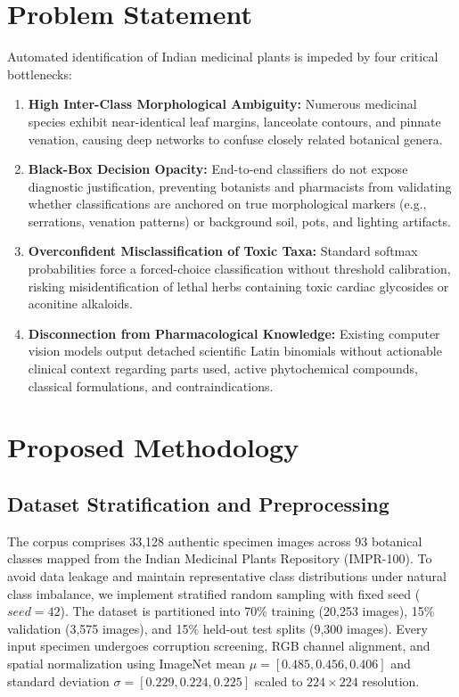 \documentclass[sn-mathphys,Numbered]{sn-jnl}%
\begin{document}
\section{Problem Statement}\label{sec3}
Automated identification of Indian medicinal plants is impeded by four critical bottlenecks:
\begin{enumerate}
    \item \textbf{High Inter-Class Morphological Ambiguity:} Numerous medicinal species exhibit near-identical leaf margins, lanceolate contours, and pinnate venation, causing deep networks to confuse closely related botanical genera.
    \item \textbf{Black-Box Decision Opacity:} End-to-end classifiers do not expose diagnostic justification, preventing botanists and pharmacists from validating whether classifications are anchored on true morphological markers (e.g., serrations, venation patterns) or background soil, pots, and lighting artifacts.
    \item \textbf{Overconfident Misclassification of Toxic Taxa:} Standard softmax probabilities force a forced-choice classification without threshold calibration, risking misidentification of lethal herbs containing toxic cardiac glycosides or aconitine alkaloids.
    \item \textbf{Disconnection from Pharmacological Knowledge:} Existing computer vision models output detached scientific Latin binomials without actionable clinical context regarding parts used, active phytochemical compounds, classical formulations, and contraindications.
\end{enumerate}

\section{Proposed Methodology}\label{sec4}
\subsection{Dataset Stratification and Preprocessing}
The corpus comprises 33,128 authentic specimen images across 93 botanical classes mapped from the Indian Medicinal Plants Repository (IMPR-100). To avoid data leakage and maintain representative class distributions under natural class imbalance, we implement stratified random sampling with fixed seed ($seed = 42$). The dataset is partitioned into 70\% training (20,253 images), 15\% validation (3,575 images), and 15\% held-out test splits (9,300 images). Every input specimen undergoes corruption screening, RGB channel alignment, and spatial normalization using ImageNet mean $\mu = [0.485, 0.456, 0.406]$ and standard deviation $\sigma = [0.229, 0.224, 0.225]$ scaled to $224 \times 224$ resolution.
\end{document}
